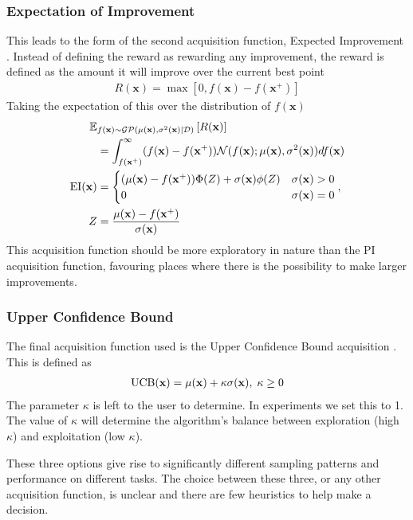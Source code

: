 \subsubsection{Expectation of Improvement}
This leads to the form of the second acquisition function, Expected Improvement \citep{jones1998efficient, mockus1978toward}. Instead of defining the reward as rewarding any improvement, the reward is defined as the amount it will improve over the current best point
\begin{align}
	R(\mathbf{x}) = \max\left[0, f(\mathbf{x}) - f(\mathbf{x}^+)\right]
\end{align}
Taking the expectation of this over the distribution of \( f(\mathbf{x}) \)
\begin{align}
	\mathbb{E}&_{f(\mathbf{x}) \sim \operatorname{\mathcal{GP}}(\mu(\mathbf{x}), \sigma^2(\mathbf{x})| \mathcal{D})}\left[  R(\mathbf{x}) \right] \\
	&= \int_{f(\mathbf{x}^+)}^{\infty} (f(\mathbf{x}) - f(\mathbf{x}^+)) \mathcal{N}(f(\mathbf{x}); \mu(\mathbf{x}), \sigma^2(\mathbf{x})) d f(\mathbf{x})\\
	\operatorname{EI}(\mathbf{x})&= \begin{cases}
		(\mu(\mathbf{x}) - f(\mathbf{x}^+)) \Phi(Z) + \sigma(\mathbf{x})\phi(Z) & \sigma(\mathbf{x}) > 0\\
		0 & \sigma(\mathbf{x}) = 0
	\end{cases},\\
	Z &= \frac{\mu(\mathbf{x}) - f(\mathbf{x}^+)}{\sigma(\mathbf{x})}
\end{align}
This acquisition function should be more exploratory in nature than the PI acquisition function, favouring places where there is the possibility to make larger improvements.

\subsubsection{Upper Confidence Bound}
The final acquisition function used is the Upper Confidence Bound acquisition \citep{cox1992statistical}. This is defined as
\begin{align}
	\operatorname{UCB}(\mathbf{x}) = \mu(\mathbf{x}) + \kappa \sigma(\mathbf{x}), \; \kappa \geq 0
\end{align}
The parameter \( \kappa \) is left to the user to determine. In experiments we set this to 1. The value of \( \kappa \) will determine the algorithm’s balance between exploration (high \( \kappa \)) and exploitation (low \( \kappa \)).

These three options give rise to significantly different sampling patterns and performance on different tasks. The choice between these three, or any other acquisition function, is unclear and there are few heuristics to help make a decision. 

